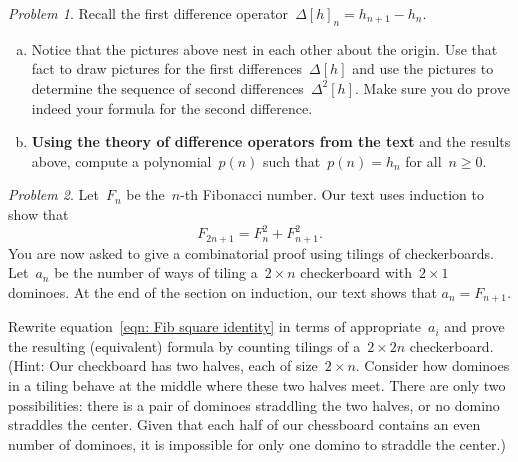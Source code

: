 \documentclass[11pt,twoside]{amsart}
\theoremstyle{plain}
\theoremstyle{remark}
\newtheorem{prob}{Problem}
\theoremstyle{definition}
\theoremstyle{definition}
\begin{document}
\begin{prob}
  Recall the first difference operator~$\Delta[h]_n=h_{n+1}-h_n$.
  \begin{enumerate}[(a)]
    \item Notice that the pictures above nest in each other about the origin.
      Use that fact to draw pictures for the first differences~$\Delta[h]$ and
      use the pictures to determine the sequence of second differences~$\Delta^2[h]$. Make sure you do prove indeed your formula for the second difference.
    \item \textbf{Using the theory of difference operators from the text} and the results
      above, compute a polynomial~$p(n)$ such that~$p(n)=h_n$ for all~$n\geq0$.
  \end{enumerate}
\end{prob}

\begin{prob} Let~$F_n$ be the~$n$-th Fibonacci number.
Our text uses induction to show that
\begin{equation}\label{eqn: Fib square identity}
  F_{2n+1}=F_n^2+F_{n+1}^2.
\end{equation}
You are now asked to give a combinatorial proof using tilings of checkerboards.
Let~$a_n$ be the number of ways of tiling a~$2\times n$ checkerboard
with~$2\times 1$ dominoes.  At the end of the section on induction, our text
shows that $a_n=F_{n+1}$. 

Rewrite equation~\eqref{eqn: Fib square identity} in terms of appropriate~$a_i$
and prove the resulting (equivalent) formula by counting tilings of a~$2\times
2n$ checkerboard.  (Hint: Our checkboard has two halves, each of size~$2\times
  n$. Consider how dominoes in a tiling behave at the middle where these two
  halves meet. There are only two possibilities: there is a pair of dominoes
  straddling the two halves, or no domino straddles the center.  Given that each
  half of our chessboard contains an even number of dominoes, it is impossible
for only one domino to straddle the center.)
\end{prob}
\end{document}
